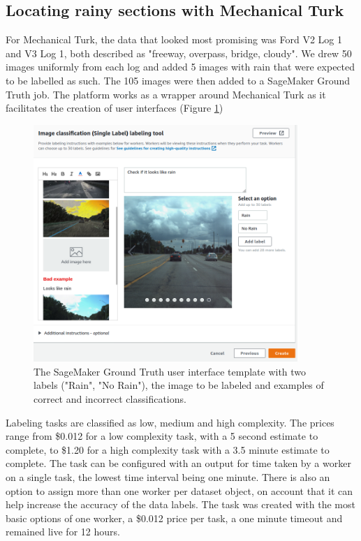 \subsection{Locating rainy sections with Mechanical Turk}
For Mechanical Turk, the data that looked most promising was Ford V2 Log 1 and V3 Log 1, both described as "freeway, overpass, bridge, cloudy". We drew 50 images uniformly from each log and added 5 images with rain that were expected to be labelled as such. The 105 images were then added to a SageMaker Ground Truth job. The platform works as a wrapper around Mechanical Turk as it facilitates the creation of user interfaces (Figure \ref{fig:MechTurkCreateJob})
\begin{figure}[h!]
\centering
\includegraphics[width=10cm]{Figures/MechTurkCreateJob.png}
\caption{The SageMaker Ground Truth user interface template with two labels ("Rain", "No Rain"), the image to be labeled and examples of correct and incorrect classifications.}
\label{fig:MechTurkCreateJob}
\end{figure}
Labeling tasks are classified as low, medium and high complexity. The prices range from \$0.012 for a low complexity task, with a 5 second estimate to complete, to \$1.20 for a high complexity task with a 3.5 minute estimate to complete.
The task can be configured with an output for time taken by a worker on a single task, the lowest time interval being one minute.
There is also an option to assign more than one worker per dataset object, on account that it can help increase the accuracy of the data labels.
The task was created with the most basic options of one worker, a \$0.012 price per task, a one minute timeout and remained live for 12 hours. 
